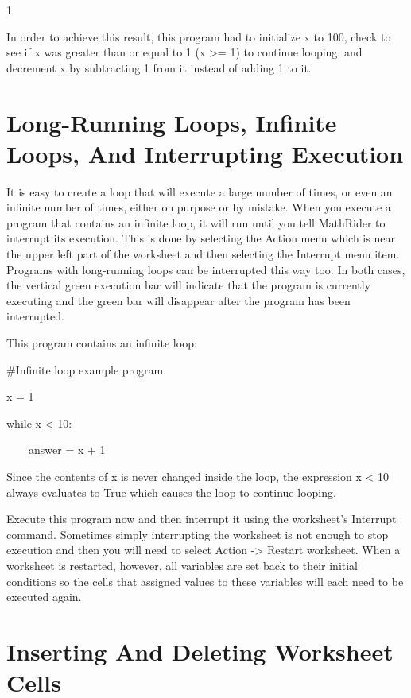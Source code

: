\documentclass[12pt,oneside]{book}
\begin{document}
1 


In order to achieve this result, this program had to initialize x to 100, check to see if x was greater than or equal to 1 (x {\textgreater}= 1) to continue looping, and decrement x by subtracting 1 from it instead of adding 1 to it.

\section[Long-Running Loops, Infinite Loops, And Interrupting Execution]{ Long-Running Loops, Infinite Loops, And Interrupting Execution}

It is easy to create a loop that will execute a large number of times, or even an infinite number of times, either on purpose or by mistake. When you execute a program that contains an infinite loop, it will run until you tell MathRider to interrupt its execution. This is done by selecting the Action menu which is near the upper left part of the worksheet and then selecting the Interrupt menu item. Programs with long{}-running loops can be interrupted this way too. In both cases, the vertical green execution bar will indicate that the program is currently executing and the green bar will disappear after the program has been interrupted. 


This program contains an infinite loop:


\#Infinite loop example program.


x = 1

while x {\textless} 10:

\ \ \ \ answer = x + 1

{\textbar}


Since the contents of x is never changed inside the loop, the expression x {\textless} 10 always evaluates to True which causes the loop to continue looping. 

Execute this program now and then interrupt it using the worksheet's Interrupt command. Sometimes simply interrupting the worksheet is not enough to stop execution and then you will need to select Action {}-{\textgreater} Restart worksheet. When a worksheet is restarted, however, all variables are set back to their initial conditions so the cells that assigned values to these variables will each need to be executed again. 

\section[Inserting And Deleting Worksheet Cells]{Inserting And Deleting Worksheet Cells}
\end{document}
